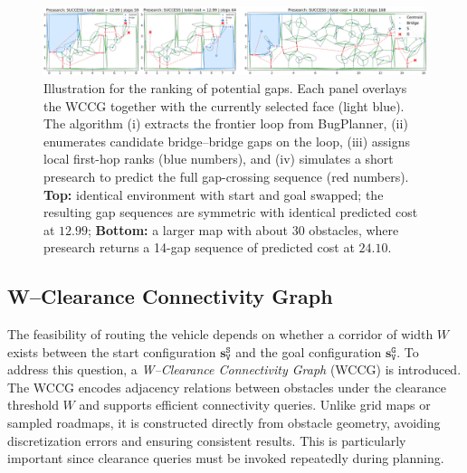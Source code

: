 \begin{figure}[t!]
  \centering
  \includegraphics[width=\linewidth]{figures/presearch.png}%
  \vspace{-0.15in}
  \caption{
  Illustration for {the ranking of potential gaps.}
  Each panel overlays the WCCG together with the currently selected face (light blue).
  The algorithm (i) extracts the frontier loop from BugPlanner,
  (ii) enumerates candidate bridge--bridge gaps on the loop,
  (iii) assigns local first-hop ranks (blue numbers),
  and (iv) simulates a short presearch to predict the full gap-crossing sequence (red numbers).
  \textbf{Top:} identical environment with start and goal swapped;
  the resulting gap sequences are symmetric with identical predicted cost at $12.99$;
  \textbf{Bottom:} a larger map with about $30$ obstacles, where presearch returns a 14-gap sequence
  of predicted cost at $24.10$.
}
  \label{fig:presearch}
  \vspace{-0.1in}
\end{figure}
\subsection{W--Clearance Connectivity Graph}\label{subsec:wccg}

The feasibility of routing the vehicle depends on whether a corridor of width
$W$ exists between the start configuration $\mathbf{s}_\texttt{V}^{\texttt{S}}$
and the goal configuration $\mathbf{s}_\texttt{V}^{\texttt{G}}$. To address
this question, a \emph{W--Clearance Connectivity Graph} (WCCG) is introduced.
The WCCG encodes adjacency relations between obstacles under the clearance
threshold $W$ and supports efficient connectivity queries. Unlike grid maps or
sampled roadmaps, it is constructed directly from obstacle geometry, avoiding
discretization errors and ensuring consistent results. This is particularly
important since clearance queries must be invoked repeatedly during planning.

